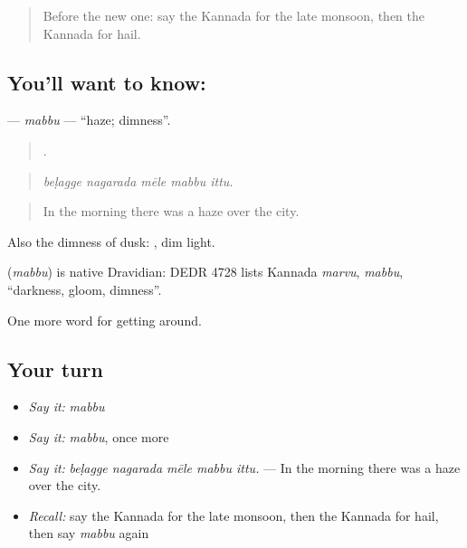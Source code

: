 \label{lesson:KA-C486-mabbu}



\begin{quote}
Before the new one: say the Kannada for the late monsoon, then the Kannada for hail.
\end{quote}

\subsection*{You'll want to know: }
\textbf{} — \emph{mabbu} — \textquotedblleft{}haze; dimness\textquotedblright{}.

\begin{quote}
    .
\end{quote}

\begin{quote}
\emph{beḷagge nagarada mēle mabbu ittu.}
\end{quote}

\begin{quote}
In the morning there was a haze over the city.
\end{quote}

Also the dimness of dusk:  , dim light.

\begin{cousinweb}
\textbf{} (\emph{mabbu}) is native Dravidian: DEDR 4728 lists Kannada \emph{marvu}, \emph{mabbu}, \textquotedblleft{}darkness, gloom, dimness\textquotedblright{}.
\end{cousinweb}

\begin{grammarlens}[title={What you've built}]
One more word for getting around.
\end{grammarlens}

\subsection*{Your turn}
\begin{itemize}
\raggedright
  \item \emph{Say it:} \emph{mabbu}
  \item \emph{Say it:} \emph{mabbu}, once more
  \item \emph{Say it:} \emph{beḷagge nagarada mēle mabbu ittu.} — In the morning there was a haze over the city.
  \item \emph{Recall:} say the Kannada for the late monsoon, then the Kannada for hail, then say \emph{mabbu} again
\end{itemize}

